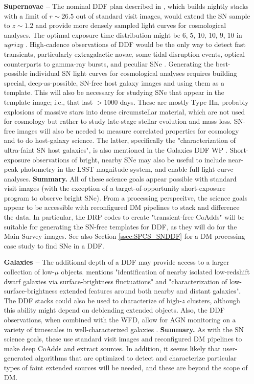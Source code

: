 \documentclass[DM,lsstdoc,toc]{lsstdoc}
\begin{document}
\noindent \textbf{Supernovae -- } The nominal DDF plan described in \citep{2008arXiv0805.2366I}, which builds nightly stacks with a limit of $r\sim26.5$ out of standard visit images, would extend the SN sample to $z\sim1.2$ and provide more densely sampled light curves for cosmological analyses. The optimal exposure time distribution might be 6, 5, 10, 10, 9, 10 in $ugrizy$ . High-cadence observations of DDF would be the only way to detect fast transients, particularly extragalactic novae, some tidal disruption events, optical counterparts to gamma-ray bursts, and peculiar SNe \citep{2014ApJ...794...23D}. Generating the best-possible individual SN light curves for cosmological analyses requires building special, deep-as-possible, SN-free host galaxy images and using them as a template. This will also be necessary for studying SNe that appear in the template image; i.e., that last $>1000$ days. These are mostly Type IIn, probably explosions of massive stars into dense circumstellar material, which are not used for cosmology but rather to study late-stage stellar evolution and mass loss. SN-free images will also be needed to measure correlated properties for cosmology and to do host-galaxy science. The latter, specifically the "characterization of ultra-faint SN host galaxies", is also mentioned in the Galaxies DDF WP . Short-exposure observations of bright, nearby SNe may also be useful to include near-peak photometry in the LSST magnitude system, and enable full light-curve analyses. \textbf{Summary.} All of these science goals appear possible with standard visit images (with the exception of a target-of-opportunity short-exposure program to observe bright SNe). From a processing perspecitve, the science goals appear to be accessible with reconfigured DM pipelines to stack and difference the data. In particular, the DRP codes to create "transient-free CoAdds" will be suitable for generating the SN-free templates for DDF, as they will do for the Main Survey images. See also Section \ref{ssec:SPCS_SNDDF} for a DM processing case study to find SNe in a DDF.

\noindent \textbf{Galaxies -- } The additional depth of a DDF may provide access to a larger collection of low-$\mu$ objects.  mentions "identification of nearby isolated low-redshift dwarf galaxies via surface-brightness fluctuations" and "characterization of low-surface-brightness extended features around both nearby and distant galaxies". The DDF stacks could also be used to characterize of high-$z$ clusters, although this ability might depend on deblending extended objects. Also, the DDF observations, when combined with the WFD, allow for AGN monitoring on a variety of timescales in well-characterized galaxies . \textbf{Summary.} As with the SN science goals, these use standard visit images and reconfigured DM pipelines to make deep CoAdds and extract sources. In addition, it seems likely that user-generated algorithms that are optimized to detect and characterize particular types of faint extended sources will be needed, and these are beyond the scope of DM.
\end{document}
